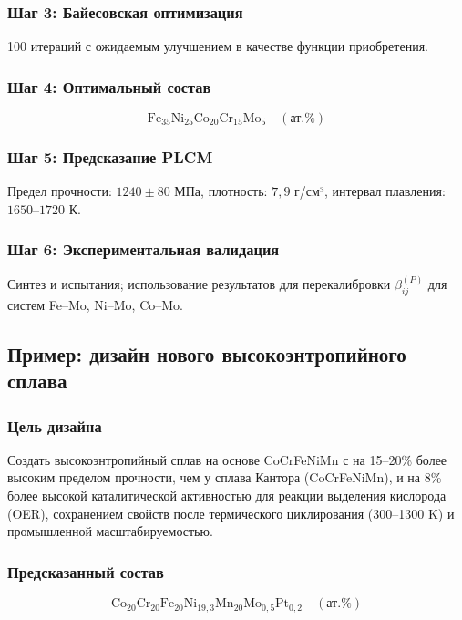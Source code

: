 \documentclass[12pt,a4paper]{article}
\begin{document}
	\subsubsection{Шаг 3: Байесовская оптимизация}
	100 итераций с ожидаемым улучшением в качестве функции приобретения.
	
	\subsubsection{Шаг 4: Оптимальный состав}
	\[
	\text{Fe}_{35}\text{Ni}_{25}\text{Co}_{20}\text{Cr}_{15}\text{Mo}_{5} \quad (\text{ат.}\%)
	\]
	
	\subsubsection{Шаг 5: Предсказание PLCM}
	Предел прочности: \(1240 \pm 80\) МПа, плотность: \(7,9\) г/см³, интервал плавления: \(1650\)–\(1720\) К.
	
	\subsubsection{Шаг 6: Экспериментальная валидация}
	Синтез и испытания; использование результатов для перекалибровки \(\beta_{ij}^{(P)}\) для систем Fe–Mo, Ni–Mo, Co–Mo.
	
	\subsection{Пример: дизайн нового высокоэнтропийного сплава}
	
	\subsubsection{Цель дизайна}
	Создать высокоэнтропийный сплав на основе CoCrFeNiMn с на 15–20\% более высоким пределом прочности, чем у сплава Кантора (CoCrFeNiMn), и на 8\% более высокой каталитической активностью для реакции выделения кислорода (OER), сохранением свойств после термического циклирования (300–1300 K) и промышленной масштабируемостью.
	
	\subsubsection{Предсказанный состав}
	\[
	\text{Co}_{20}\text{Cr}_{20}\text{Fe}_{20}\text{Ni}_{19,3}\text{Mn}_{20}\text{Mo}_{0,5}\text{Pt}_{0,2}\quad (\text{ат.}\%)
	\]
	
\end{document}

